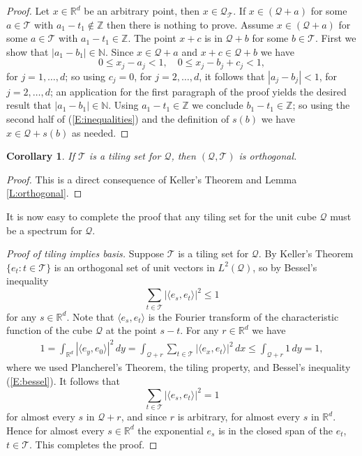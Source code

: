 \documentclass[12pt]{amsart}
\theoremstyle{plain}
\newtheorem{corollary}[theorem]{Corollary}
\numberwithin{equation}{section}
\newcommand{\Q}{\ensuremath{\mathcal{Q}}\xspace}
\newcommand{\T}{\ensuremath{\mathcal{T}}\xspace}
\newcommand{\Rd}{\ensuremath{\mathbb{R}^{d}}\xspace}
\newcommand{\N}{\ensuremath{\mathbb{N}}\xspace}
\newcommand{\Z}{\ensuremath{\mathbb{Z}}\xspace}
\begin{document}
\begin{proof}
   Let $x\in\Rd$ be an arbitrary point, then $x\in\Q_{\T}$. If
   $x\in (\Q+a)$ for some $a\in\T$ with $a_1-t_1\notin\Z$ then there
   is nothing to prove. Assume $x\in (\Q+a)$ for some $a\in\T$ with
   $a_1-t_1\in\Z$. The point $x+c$ is in $\Q+b$ for some $b\in\T$.
   First we show that $|a_1-b_1|\in\N$. Since $x\in\Q+a$ and
   $x+c\in\Q+b$ we have
   \begin{equation}\label{E:inequalities}
      0\leq x_j-a_j<1, \quad
      0\leq x_j-b_j+c_j<1,
   \end{equation}
   for $j=1,\ldots,d$; so using $c_j=0$, for $j=2,\ldots,d$, it
   follows that $|a_j-b_j|<1$, for $j=2,\ldots,d$; an application
   for the first paragraph of the proof yields the desired result
   that $|a_1-b_1|\in\N$. Using $a_1-t_1\in\Z$ we conclude
   $b_1-t_1\in\Z$; so using the second half of (\ref{E:inequalities})
   and the definition
   of $s(b)$ we have $x\in\Q+s(b)$ as needed.
\end{proof}

\begin{corollary}
   If \T is a tiling set for \Q, then $(\Q,\T)$ is orthogonal.
\end{corollary}
\begin{proof}
   This is a direct consequence of Keller's Theorem and Lemma
   \ref{L:orthogonal}.
\end{proof}
It is now easy to complete the proof that any tiling set for the unit
cube \Q must be a spectrum for \Q.
\begin{proof}[Proof of tiling implies basis]
   Suppose \T is a tiling set for \Q. By Keller's Theorem
   $\{e_t:t\in\T\}$ is an orthogonal set of unit vectors in
   $L^2(\Q)$, so by
   Bessel's inequality
   \begin{equation}\label{E:bessel}
      \sum_{t\in\T} |\langle e_s,e_t\rangle|^2 \leq 1
   \end{equation}
   for any $s\in\Rd$. Note that $\langle e_s,e_t\rangle$ is the
   Fourier transform of the characteristic function of the cube \Q at
   the point $s-t$.
   For any $r\in\Rd$ we have
   \begin{align*}
      1=\int_{\Rd}|\langle e_y,e_0\rangle|^2\, dy
       =\int_{\Q+r}\sum_{t\in\T}|\langle e_x,e_t\rangle|^2\, dx
       \leq \int_{\Q+r}1\,dy =1,
   \end{align*}
   where we used Plancherel's Theorem, the tiling property,
   and Bessel's inequality (\ref{E:bessel}). It follows that
   \begin{equation}\label{E:almost}
      \sum_{t\in\T} |\langle e_s,e_t\rangle|^2=1
   \end{equation}
   for almost every $s$ in $\Q+r$, and since $r$ is arbitrary,
   for almost every $s$ in \Rd. Hence for almost every $s\in\Rd$ the
   exponential $e_s$ is in the closed span of the
   $e_t$, $t\in\T$. This completes the proof.
\end{proof}
 
\end{document}
